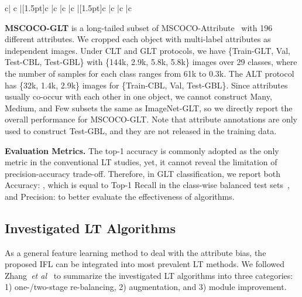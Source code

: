 \documentclass{article}
\def\etal{\emph{et al}}
\begin{document}
\begin{table*}[t!]
{\begin{tabu}{c| c |[1.5pt]c |c |c |c |[1.5pt]c |c |c |c }
\hline
\hline
\end{tabu}
}
\label{tab:1}
\end{table*}




\noindent\textbf{MSCOCO-GLT} is a long-tailed subset of MSCOCO-Attribute~\cite{patterson2016coco,lin2014microsoft} with 196 different attributes. We cropped each object with multi-label attributes as independent images. Under CLT and GLT protocols, we have \{Train-GLT, Val, Test-CBL, Test-GBL\} with \{144k, 2.9k, 5.8k, 5.8k\} images over 29 classes, where the number of samples for each class ranges from 61k to 0.3k. The ALT protocol has \{32k, 1.4k, 2.9k\} images for \{Train-CBL, Val, Test-GBL\}. Since attributes usually co-occur with each other in one object, we cannot construct Many, Medium, and Few subsets the same as ImageNet-GLT, so we directly report the overall performance for MSCOCO-GLT. Note that attribute annotations are only used to construct Test-GBL, and they are not released in the training data.





\noindent\textbf{Evaluation Metrics.} The top-1 accuracy is commonly adopted as the only metric in the conventional LT studies, yet, it cannot reveal the limitation of precision-accuracy trade-off. Therefore, in GLT classification, we report both Accuracy: , which is equal to Top-1 Recall in the class-wise balanced test sets~\cite{zhu2021cross}, and Precision:  to better evaluate the effectiveness of algorithms.







\subsection{Investigated LT Algorithms} 

As a general feature learning method to deal with the attribute bias, the proposed IFL can be integrated into most prevalent LT methods. We followed Zhang~\etal~\cite{zhang2021deep} to summarize the investigated LT algorithms into three categories: 1) one-/two-stage re-balancing, 2) augmentation, and 3) module improvement.
\end{document}
